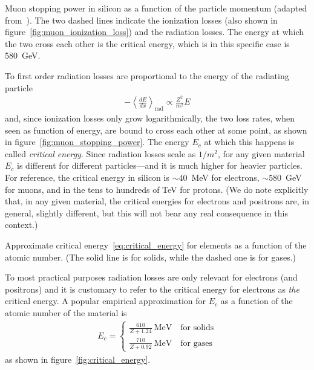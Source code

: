 \begin{marginfigure}
  
  \caption{Muon stopping power in silicon as a function of the particle momentum
    (adapted from~\cite{PDG}). The two dashed lines indicate the ionization losses
    (also shown in figure~\ref{fig:muon_ionization_loss}) and the radiation
    losses. The energy at which the two cross each other is the critical energy,
    which is in this specific case is 580~GeV.}
  \label{fig:muon_stopping_power}
\end{marginfigure}

To first order radiation losses are proportional to the energy of the radiating
particle
\begin{align}\label{eq:rad_losses}
  -\left<\frac{dE}{dx}\right>_\text{rad} \!\!\!\!\!\! \propto \frac{Z^2}{m^2} E
\end{align}
and, since ionization losses only grow logarithmically, the two loss rates, when
seen as function of energy, are bound to cross each other at some point, as shown
in figure~\ref{fig:muon_stopping_power}. The energy $E_c$ at which this
happens is called \emph{critical energy}. Since radiation losses scale as $1/m^2$,
for any given material $E_c$ is different for different particles---and it is
much higher for heavier particles. For reference, the critical energy in silicon
is $\sim 40$~MeV for electrons, $\sim 580$~GeV for muons, and in the tens to
hundreds of TeV for protons. (We do note explicitly that, in any given material,
the critical energies for electrons and positrons are, in general, slightly different,
but this will not bear any real consequence in this context.)

\begin{marginfigure}
  
  \caption{Approximate critical energy~\eqref{eq:critical_energy} for elements as
    a function of the atomic number. (The solid line is for solids, while the
    dashed one is for gases.)}
  \label{fig:critical_energy}
\end{marginfigure}

To most practical purposes radiation losses are only relevant for electrons
(and positrons) and it is customary to refer to the critical energy for electrons
as \emph{the} critical energy. A popular empirical approximation for $E_c$ as a
function of the atomic number of the material is
\begin{align}\label{eq:critical_energy}
  E_c =
  \begin{cases}
    \displaystyle\frac{610}{Z + 1.24}~\text{MeV}\quad\text{for solids}\\[8pt]
    \displaystyle\frac{710}{Z + 0.92}~\text{MeV}\quad\text{for gases}
  \end{cases}
\end{align}
as shown in figure~\ref{fig:critical_energy}.


